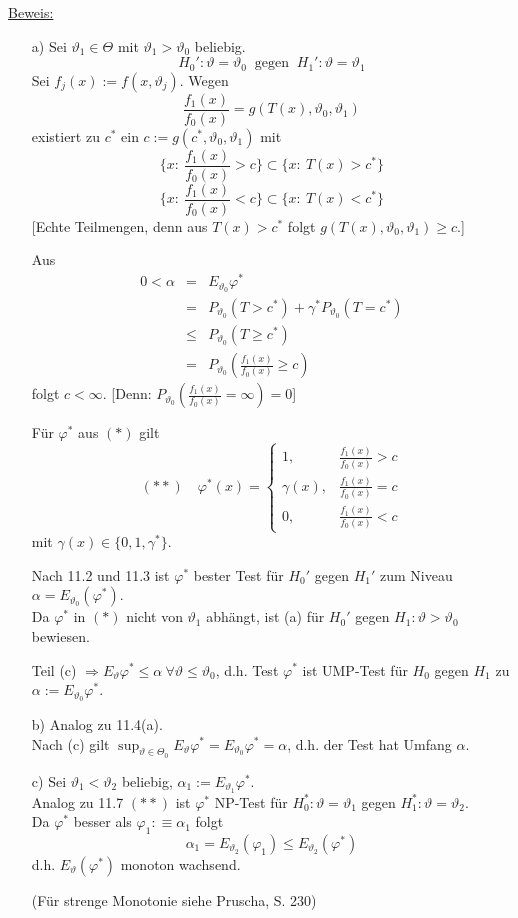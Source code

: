\documentclass[a4paper,11pt,twoside,titlepage]{article}
\begin{document}
\underline{Beweis:}
\begin{itemize}
\item[a)] Sei $\vartheta_1\in\Theta$ mit $\vartheta_1>\vartheta_0$ beliebig.
\[H_0':\vartheta=\vartheta_0\ \mbox{ gegen }\ H_1':\vartheta=\vartheta_1\]
Sei $f_j(x):=f(x,\vartheta_j)$. Wegen
\[\frac{f_1(x)}{f_0(x)}=g(T(x),\vartheta_0,\vartheta_1)\]
existiert zu $c^\ast$ ein $c:=g(c^\ast,\vartheta_0,\vartheta_1)$ mit 
\[\{x:\ \frac{f_1(x)}{f_0(x)}>c\}\subset\{x:\ T(x)>c^\ast\}\]
\[\{x:\ \frac{f_1(x)}{f_0(x)}<c\}\subset\{x:\ T(x)<c^\ast\}\]
[Echte Teilmengen, denn aus $T(x)>c^\ast$ folgt $g(T(x),\vartheta_0,\vartheta_1)\geq c$.]

Aus
\begin{eqnarray*}
0<\alpha&=&E_{\vartheta_0}\varphi^\ast\\
&=&P_{\vartheta_0}(T>c^\ast)+\gamma^\ast P_{\vartheta_0}(T=c^\ast)\\
&\leq&P_{\vartheta_0}(T\geq c^\ast)\\
&=&P_{\vartheta_0}(\frac{f_1(x)}{f_0(x)}\geq c)\end{eqnarray*}
folgt $c<\infty$. [Denn: $P_{\vartheta_0}(\frac{f_1(x)}{f_0(x)}=\infty)=0$]

Für $\varphi^\ast$ aus $(\ast)$ gilt
\[(\ast\ast)\quad\varphi^\ast(x)=\left\{\begin{array}{ll}1,&\frac{f_1(x)}{f_0(x)}>c\\\gamma(x),&\frac{f_1(x)}{f_0(x)}=c\\0,&\frac{f_1(x)}{f_0(x)}<c\end{array}\right.\]
mit $\gamma(x)\in\{0,1,\gamma^\ast\}$.

Nach 11.2 und 11.3 ist $\varphi^\ast$ bester Test für $H_0'$ gegen $H_1'$ zum Niveau $\alpha=E_{\vartheta_0}(\varphi^\ast)$.\\
Da $\varphi^\ast$ in $(\ast)$ nicht von $\vartheta_1$ abhängt, ist (a) für $H_0'$ gegen $H_1:\vartheta>\vartheta_0$ bewiesen.

Teil (c) $\Rightarrow E_\vartheta\varphi^\ast\leq\alpha\ \forall\vartheta\leq\vartheta_0$, d.h. Test $\varphi^\ast$ ist UMP-Test für $H_0$ gegen $H_1$ zu $\alpha:=E_{\vartheta_0}\varphi^\ast$.
\item[b)] Analog zu 11.4(a).\\
Nach (c) gilt $\sup_{\vartheta\in\Theta_0}E_\vartheta\varphi^\ast=E_{\vartheta_0}\varphi^\ast=\alpha$, d.h. der Test hat Umfang $\alpha$.
\item[c)] Sei $\vartheta_1<\vartheta_2$ beliebig, $\alpha_1:=E_{\vartheta_1}\varphi^\ast$.\\
Analog zu 11.7 $(\ast\ast)$ ist $\varphi^\ast$ NP-Test für $H_0^\ast:\vartheta=\vartheta_1$ gegen $H_1^\ast:\vartheta=\vartheta_2$.\\
Da $\varphi^\ast$ besser als $\varphi_1:\equiv\alpha_1$ folgt
\[\alpha_1=E_{\vartheta_2}(\varphi_1)\leq E_{\vartheta_2}(\varphi^\ast)\]
d.h. $E_\vartheta(\varphi^\ast)$ monoton wachsend.

(Für strenge Monotonie siehe Pruscha, S. 230)
\end{itemize}
\end{document}
